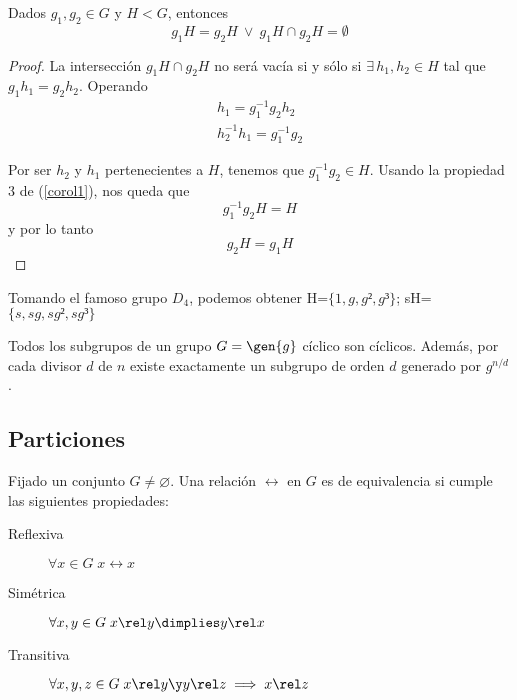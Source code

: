 \documentclass[nochap]{apuntes}
\begin{document}
  \begin{prop}
   Dados $g_{1}, g_{2}\in G$ y $H<G$, entonces \[ g_{1}H=g_{2}H \  \vee \ g_{1}H\cap g_{2}H=\emptyset \]
  \end{prop}

  \begin{proof}
   La intersección $g_{1}H\cap g_{2}H$ no será vacía si y sólo si $\exists\, h_{1},h_{2} \in H$ tal que $g_{1}h_{1}=g_{2}h_{2}$. Operando
   \begin{gather*}
   h_{1}=g_{1}^{-1}g_{2}h_{2} \\
   h_{2}^{-1}h_{1}=g_{1}^{-1}g_{2}
   \end{gather*}

   Por ser $h_2$ y $h_1$ pertenecientes a $H$, tenemos que $g_{1}^{-1}g_{2} \in H$. Usando la propiedad 3 de (\ref{corol1}), nos queda que
    \[ g_{1}^{-1}g_{2}H=H  \] y por lo tanto \[ g_{2}H=g_{1}H \]
  \end{proof}

  \begin{example}
   Tomando el famoso grupo $D_{4}$, podemos obtener H=$\{1,g,g²,g³\}$; sH=$\{s,sg,sg²,sg³\}$
  \end{example}

  \begin{theorem} Todos los subgrupos de un grupo $G=\gen{g}$ cíclico son cíclicos. Además, por cada divisor $d$ de $n$ existe exactamente un subgrupo de orden $d$ generado por $g^{n/d}$.
   \end{theorem}

\subsection{Particiones}
\begin{defn}
   Fijado un conjunto $G\neq\varnothing$. Una relación $\rel$ en $G$ es de equivalencia si cumple las siguientes propiedades:

   \begin{description}
    \item[Reflexiva] $\forall x\in G \;  x\rel x$
    \item[Simétrica] $\forall x,y \in G\;  x\rel y \dimplies y \rel x$
    \item[Transitiva] $\forall x,y,z \in G\;  x\rel y \y  y\rel z \implies x\rel z$
   \end{description}
  \end{defn}
\end{document}
